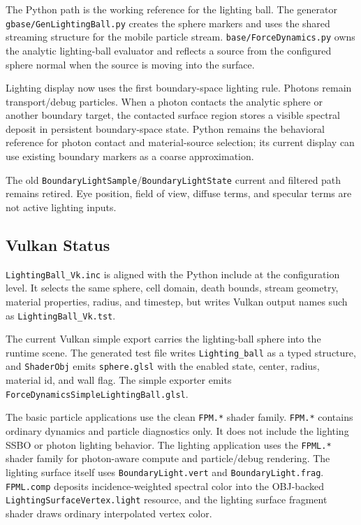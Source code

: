 The Python path is the working reference for the lighting ball.  The
generator \texttt{gbase/GenLightingBall.py} creates the sphere markers and
uses the shared streaming structure for the mobile particle stream.
\texttt{base/ForceDynamics.py} owns the analytic lighting-ball evaluator and
reflects a source from the configured sphere normal when the source is moving
into the surface.

Lighting display now uses the first boundary-space lighting rule.  Photons
remain transport/debug particles.  When a photon contacts the analytic sphere
or another boundary target, the contacted surface region stores a visible
spectral deposit in persistent boundary-space state.  Python remains the
behavioral reference for photon contact and material-source selection; its
current display can use existing boundary markers as a coarse approximation.

The old \texttt{BoundaryLightSample}/\texttt{BoundaryLightState} current and
filtered path remains retired.  Eye position, field of view, diffuse terms,
and specular terms are not active lighting inputs.

\subsection{Vulkan Status}

\texttt{LightingBall\_Vk.inc} is aligned with the Python include at the
configuration level.  It selects the same sphere, cell domain, death bounds,
stream geometry, material properties, radius, and timestep, but writes Vulkan
output names such as \texttt{LightingBall\_Vk.tst}.

The current Vulkan simple export carries the lighting-ball sphere into the
runtime scene.  The generated test file writes \texttt{Lighting\_ball} as a
typed structure, and \texttt{ShaderObj} emits \texttt{sphere.glsl} with the
enabled state, center, radius, material id, and wall flag.  The simple exporter
emits \texttt{ForceDynamicsSimpleLightingBall.glsl}.

The basic particle applications use the clean \texttt{FPM.*} shader family.
\texttt{FPM.*} contains ordinary dynamics and particle diagnostics only.  It
does not include the lighting SSBO or photon lighting behavior.  The lighting
application uses the \texttt{FPML.*} shader family for photon-aware compute
and particle/debug rendering.  The lighting surface itself uses
\texttt{BoundaryLight.vert} and \texttt{BoundaryLight.frag}.  \texttt{FPML.comp}
deposits incidence-weighted spectral color into the OBJ-backed
\texttt{LightingSurfaceVertex.light} resource, and the lighting surface
fragment shader draws ordinary interpolated vertex color.

